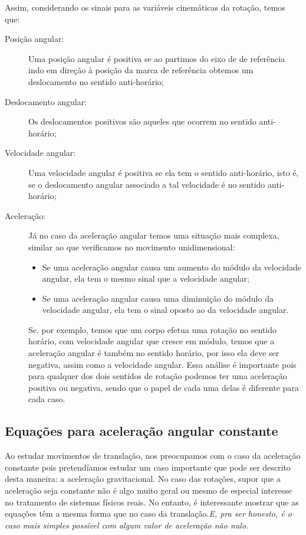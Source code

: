 Assim, considerando os sinais para as variáveis cinemáticas da rotação, temos que:
\begin{description}
    \item[Posição angular:] Uma posição angular é positiva se ao partimos do eixo de de referência indo em direção à posição da marca de referência  obtemos um deslocamento no sentido anti-horário;
    \item[Deslocamento angular:] Os deslocamentos positivos são aqueles que ocorrem no sentido anti-horário;
    \item[Velocidade angular:] Uma velocidade angular é positiva se ela tem o sentido anti-horário, isto é, se o deslocamento angular associado a tal velocidade é no sentido anti-horário;
    \item[Aceleração:] Já no caso da aceleração angular temos uma situação mais complexa, similar ao que verificamos no movimento unidimensional:
    \begin{itemize}
        \item Se uma aceleração angular causa um aumento do módulo da velocidade angular, ela tem o mesmo sinal que a velocidade angular;
        \item Se uma aceleração angular causa uma diminuição do módulo da velocidade angular, ela tem o sinal oposto ao da velocidade angular.
    \end{itemize}
%
Se, por exemplo, temos que um corpo efetua uma rotação no sentido horário, com velocidade angular que cresce em módulo, temos que a aceleração angular é também no sentido horário, por isso ela deve ser negativa, assim como a velocidade angular. Essa análise é importante pois para qualquer dos dois sentidos de rotação podemos ter uma aceleração positiva ou negativa, sendo que o papel de cada uma delas é diferente para cada caso.
\end{description}

\subsection{Equações para aceleração angular constante}

Ao estudar movimentos de translação, nos preocupamos com o caso da aceleração constante pois pretendíamos estudar um caso importante que pode ser descrito desta maneira: a aceleração gravitacional. No caso das rotações, supor que a aceleração seja constante não é algo muito geral ou mesmo de especial interesse no tratamento de sistemas físicos reais. No entanto, é interessante mostrar que as equações têm a mesma forma que no caso da translação.\emph{E, pra ser honesto, é o caso mais simples possível com algum valor de aceleração não nulo.}

